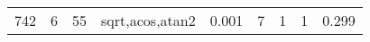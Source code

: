 \begin{table}[h!]
\begin{center}
\begin{tabular}{|l||r|r|r||r|r|r|r|r|}
742 & 6 & 55 & sqrt,acos,atan2 & 0.001 & 7 & 1 & 1 & 0.299 \\

\end{tabular}
\end{center}
\end{table}

